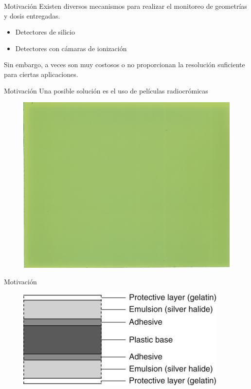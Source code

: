\documentclass[12pt]{beamer}
\begin{document}
\begin{frame}{Motivación}
	Existen diversos mecanismos para realizar el monitoreo de geometrías y dosis entregadas.\\
	\begin{itemize}
		\item Detectores de silicio
		\item Detectores con cámaras de ionización 
	\end{itemize}
	Sin embargo, a veces son muy costosos o no proporcionan la resolución suficiente para ciertas aplicaciones.
\end{frame}

\begin{frame}{Motivación}
	Una posible solución es el uso de películas radiocrómicas 
	\begin{figure}
		\centering
		\includegraphics[width=0.7\linewidth]{images/fondoblancoLandscape-1.png}
	\end{figure}
\end{frame}

\begin{frame}{Motivación}
	\begin{figure}
		\centering
		\includegraphics[width=0.7\linewidth]{images/radiographic-film.jpg}
	\end{figure}
\end{frame}
\end{document}
